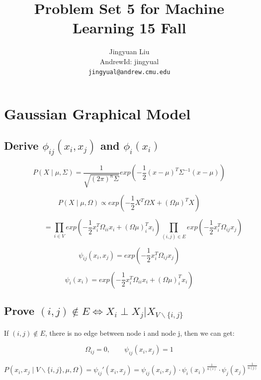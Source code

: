 \documentclass{article} %
\title{Problem Set 5 for Machine Learning 15 Fall}
\author{
Jingyuan Liu\\
AndrewId: jingyual\\
\texttt{jingyual@andrew.cmu.edu} \\
}
\begin{document}
\maketitle



\section{Gaussian Graphical Model}


\subsection{Derive $\phi_{ij} (x_i, x_j)$ and $\phi_i (x_i)$}

\begin{equation}
P(X \mid \mu, \Sigma) = \frac{1}{\sqrt{(2\pi)^n \Sigma}}
exp (-\frac{1}{2} (x-\mu)^T \Sigma^{-1} (x-\mu))
\end{equation}

\begin{equation}
P(X \mid \mu, \Omega) \propto exp (-\frac{1}{2} X^T \Omega X + (\Omega \mu)^T X)
\end{equation}

\begin{equation}
\qquad \qquad =
\prod_{i \in V} exp (-\frac{1}{2} x_i^T \Omega_{ii} x_i + (\Omega \mu)_i^T x_i)
\prod_{(i, j) \in E} exp( -\frac{1}{2} x_i^T \Omega_{ij} x_j)
\end{equation}

\begin{equation}
\psi_{ij} (x_i, x_j) =
exp( -\frac{1}{2} x_i^T \Omega_{ij} x_j)
\end{equation}

\begin{equation}
\psi_{i} (x_i) =
exp (-\frac{1}{2} x_i^T \Omega_{ii} x_i + (\Omega \mu)_i^T x_i)
\end{equation}

\subsection{Prove $(i,j ) \notin E \iff X_i \perp X_j | X_{V\backslash\{i,j\}}$}
If $(i, j) \notin E$, there is no edge between node i
and node j, then we can get:

\begin{equation}
\Omega_{ij} = 0, \qquad \psi_{ij} (x_i, x_j) = 1
\end{equation}

\begin{equation}
P (x_i, x_j \mid V\backslash\{i,j\}, \mu, \Omega) = \psi_{ij}' (x_i, x_j)
= \psi_{ij} (x_i, x_j) \cdot \psi_i (x_i)^{\frac{1}{n(i)}}
\cdot \psi_j (x_j)^{\frac{1}{n(j)}}
\end{equation}
\end{document}
